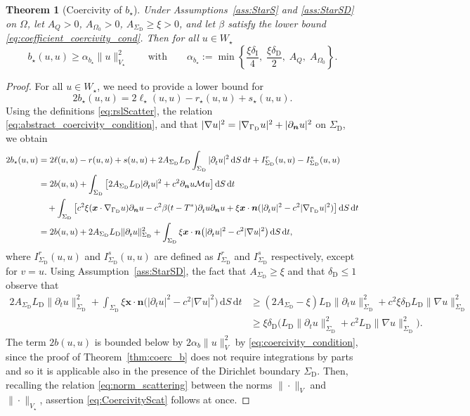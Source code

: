 \documentclass[a4paper]{article}
\theoremstyle{plain}
\newtheorem{theorem}{Theorem}[section]
\theoremstyle{definition}
\newcommand{\operator}[1]{\mathcal{#1}}
\newcommand{\dt}{{\,\mathrm{d}t}}
\newcommand{\dS}{{\,\mathrm{d}S}}
\newcommand{\Grad}[1]{\nabla #1}
\newcommand{\TimeDer}{{\partial^{}_t}}
\newcommand{\NormDer}{{\partial_{\bm{n}}}}
\newcommand{\vect}[1]{\bm{#1}}
\newcommand{\LD}{L_{\mathrm D}}
\newcommand{\Vs}{{V_{\star}}}
\newcommand{\Ws}{{W_{\star}}}
\newcommand{\deltaI}{{\delta_{\mathrm I}}}
\newcommand{\deltaD}{{\delta_{\mathrm D}}}
\newcommand{\GD}{{\Gamma_{\mathrm D}}}
\newcommand{\SD}{{\Sigma_{\mathrm D}}}
\newcommand{\oM}{{\operator{M}}}
\newcommand{\vx}{{\vect x}}
\newcommand{\vn}{{\vect n}}
\newcommand{\OZ}{{\Omega_0}}
\newcommand{\GradGD}{{\Grad_{\GD}}}
\begin{document}
\begin{theorem}[Coercivity of $b_\star$]	\label{thm:coercBScat}
Under Assumptions~\ref{ass:StarS} and \ref{ass:StarSD} on $\Omega$, let $A_Q > 0$, $A_\OZ > 0$, $A_\SD \geq \xi > 0$, and let $\beta$ satisfy the lower bound \eqref{eq:coefficient_coercivity_cond}.
Then for all $u \in \Ws$
\begin{equation}\label{eq:CoercivityScat}
b_\star(u,u) \geq \alpha_{b_\star}\|u\|_\Vs^2 \qquad \text{with}\qquad
\alpha_{b_\star}:= \min\left\{\frac{\xi\deltaI}{4},\;\frac{\xi\deltaD}{2},\; A_Q,\; A_\OZ \right\}.
\end{equation}
\end{theorem}
\begin{proof}
For all $u \in \Ws$, we need to provide a lower bound for
\begin{equation*}
2 b_\star(u,u) = 2\ell_\star(u, u) - r_\star(u,u) + s_\star(u,u).
\end{equation*}
Using the definitions \eqref{eq:rslScatter}, the relation \eqref{eq:abstract_coercivity_condition}, and that $|\nabla u|^2=|\GradGD u|^2+|\NormDer u|^2$ on $\SD$,
we obtain
\begin{align*}
2 b_\star(u,u) & =
2\ell(u,u)- r(u, u) + s(u, u) +2A_\SD\LD\int_\SD |\TimeDer u|^2\dS\dt + I_\SD^r(u,u)- I_\SD^s(u,u)\\
&=2b(u,u) +  \int_\SD \big[2A_\SD \LD|\TimeDer u|^2 + c^2 \NormDer u \oM u \big]\dS \dt\\
&\quad + \int_{\SD} \big[c^2 \xi(\vx \cdot \GradGD u)\NormDer u - c^2 \beta (t-T^*) \TimeDer u \NormDer u
+ \xi \vect{x} \cdot \vect{n}(|\TimeDer u|^2 - c^2 |\GradGD u|^2)\big] \dS \dt \\
& = 2b(u,u) + 2A_\SD \LD \|\TimeDer u\|^2_\SD
+ \int_\SD \xi \vx\cdot\vn \big(|\TimeDer u|^2-c^2|\Grad u|^2 \big) \dS \dt,
\end{align*}
where $I_\SD^r(u, u)$ and $I_\SD^s(u,u)$ are defined as $I_\SD^r$ and $I_\SD^s$ respectively, except for $v=u$.
Using Assumption~\ref{ass:StarSD}, the fact that $A_\SD\geq\xi$ and that $\deltaD\le1$ observe that
\begin{align*}
2A_\SD \LD \|\TimeDer u\|^2_\SD + \int_\SD \xi \vx\cdot\vn \big(|\TimeDer u|^2-c^2|\Grad u|^2 \big) \dS \dt & \geq (2A_\SD - \xi)\LD \|\TimeDer u \|^2_\SD + c^2 \xi\deltaD\LD\|\Grad u\|^2_\SD \\
& \geq \xi \deltaD\big(\LD \|\TimeDer u \|^2_\SD + c^2\LD\|\Grad u\|^2_\SD\big).
\end{align*}
The term $2b(u,u)$ is bounded below by $2\alpha_b\|u\|_V^2$ by \eqref{eq:coercivity_condition}, since the proof of Theorem~\ref{thm:coerc_b} does not require integrations by parts and so it is applicable also in the presence of the Dirichlet boundary $\SD$.
Then, recalling the relation \eqref{eq:norm_scattering} between the norms $\|\cdot\|_V$ and $\|\cdot\|_\Vs$, assertion \eqref{eq:CoercivityScat} follows at once.
\end{proof}
\end{document}
